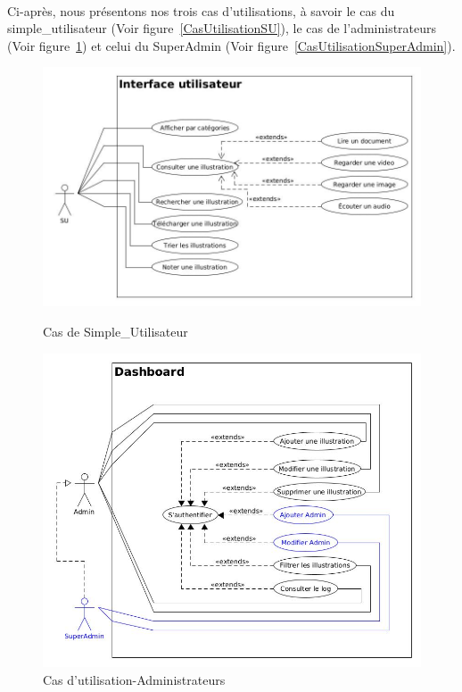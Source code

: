 		\paragraph{} Ci-apr\`es, nous pr\'esentons nos trois cas d'utilisations, \`a savoir le cas du simple\_utilisateur (Voir figure~\ref{CasUtilisationSU}), le cas de l'administrateurs (Voir figure~\ref{CasUtilisationAdmin}) et celui du SuperAdmin (Voir figure~\ref{CasUtilisationSuperAdmin}).
							
			
			
		\begin{figure}[!ht]
			\begin{minipage}{0.5\textwidth}
				\centering
				\includegraphics[width=0.9\linewidth]{Pictures/DiagrammeDesCasDUtilisationSU.jpg}
				\caption{Cas de Simple\_Utilisateur}
				\label{CasUtilisationSU}
			\end{minipage}
			\begin{minipage}{0.5\textwidth}
				\centering
				\includegraphics[width=0.9\linewidth]{Pictures/DiagrammeDesCasDUtilisationAdmin.jpg}
				\caption{Cas d'utilisation-Administrateurs}
				\label{CasUtilisationAdmin}
			\end{minipage}
		\end{figure}
			
